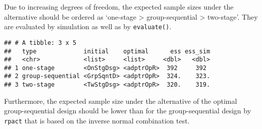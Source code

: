 \documentclass[]{book}
\newenvironment{Shaded}{\begin{snugshade}}{\end{snugshade}}
\newcommand{\CommentTok}[1]{\textcolor[rgb]{0.56,0.35,0.01}{\textit{#1}}}
\newcommand{\DataTypeTok}[1]{\textcolor[rgb]{0.13,0.29,0.53}{#1}}
\newcommand{\DecValTok}[1]{\textcolor[rgb]{0.00,0.00,0.81}{#1}}
\newcommand{\FloatTok}[1]{\textcolor[rgb]{0.00,0.00,0.81}{#1}}
\newcommand{\KeywordTok}[1]{\textcolor[rgb]{0.13,0.29,0.53}{\textbf{#1}}}
\newcommand{\NormalTok}[1]{#1}
\newcommand{\OperatorTok}[1]{\textcolor[rgb]{0.81,0.36,0.00}{\textbf{#1}}}
\newcommand{\StringTok}[1]{\textcolor[rgb]{0.31,0.60,0.02}{#1}}
\begin{document}
Due to increasing degrees of freedom, the expected sample sizes under the
alternative should be ordered as `one-stage \textgreater{} group-sequential \textgreater{} two-stage'.
They are evaluated by simulation as well as by \texttt{evaluate()}.

\begin{Shaded}
\end{Shaded}

\begin{verbatim}
## # A tibble: 3 x 5
##   type             initial    optimal      ess ess_sim
##   <chr>            <list>     <list>     <dbl>   <dbl>
## 1 one-stage        <OnStgDsg> <adptrOpR>  392     392 
## 2 group-sequential <GrpSqntD> <adptrOpR>  324.    323.
## 3 two-stage        <TwStgDsg> <adptrOpR>  320.    319.
\end{verbatim}

Furthermore, the expected sample size under the alternative of the
optimal group-sequential design should be lower than for the
group-sequential design by \texttt{rpact} that is based on the inverse normal
combination test.
\end{document}
